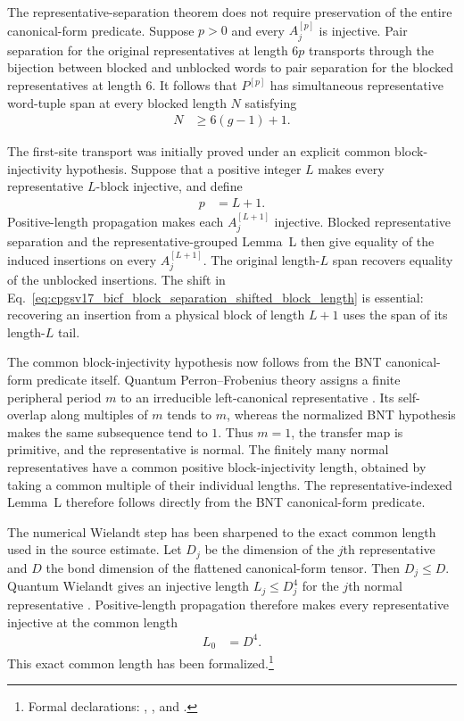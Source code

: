 \documentclass{article}
\begin{document}
The representative-separation theorem does not require preservation of the
entire canonical-form predicate. Suppose $p>0$ and every $A_j^{[p]}$ is
injective. Pair separation for the original representatives at length $6p$
transports through the bijection between blocked and unblocked words to pair
separation for the blocked representatives at length $6$. It follows that
$P^{[p]}$ has simultaneous representative word-tuple span at every blocked
length $N$ satisfying
\begin{align}
    N
        &\geq 6(g-1)+1.
    \label{eq:cpgsv17_bicf_block_separation_eventual_blocked_span_length}
\end{align}

The first-site transport was initially proved under an explicit common
block-injectivity hypothesis. Suppose that a positive integer $L$ makes every
representative $L$-block injective, and define
\begin{align}
    p
        &= L+1.
    \label{eq:cpgsv17_bicf_block_separation_shifted_block_length}
\end{align}
Positive-length propagation makes each $A_j^{[L+1]}$ injective. Blocked
representative separation and the representative-grouped Lemma~L then give
equality of the induced insertions on every $A_j^{[L+1]}$. The original
length-$L$ span recovers equality of the unblocked insertions. The shift in
Eq.~\ref{eq:cpgsv17_bicf_block_separation_shifted_block_length} is essential:
recovering an insertion from a physical block of length $L+1$ uses the span of
its length-$L$ tail.

The common block-injectivity hypothesis now follows from the BNT
canonical-form predicate itself. Quantum Perron--Frobenius theory assigns a
finite peripheral period $m$ to an irreducible left-canonical representative
\cite{Wolf2012Quantum}. Its self-overlap along multiples of $m$ tends to $m$,
whereas the normalized BNT hypothesis makes the same subsequence tend to $1$.
Thus $m=1$, the transfer map is primitive, and the representative is normal.
The finitely many normal representatives have a common positive
block-injectivity length, obtained by taking a common multiple of their
individual lengths. The representative-indexed Lemma~L therefore follows
directly from the BNT canonical-form predicate.

The numerical Wielandt step has been sharpened to the exact common length used
in the source estimate. Let $D_j$ be the dimension of the $j$th representative
and $D$ the bond dimension of the flattened canonical-form tensor. Then
$D_j\leq D$. Quantum Wielandt gives an injective length $L_j\leq D_j^4$ for
the $j$th normal representative \cite{Sanz2010Quantum}. Positive-length
propagation therefore makes every representative injective at the common
length
\begin{align}
    L_0
        &= D^4.
    \label{eq:cpgsv17_bicf_block_separation_common_wielandt_length}
\end{align}
This exact common length has been formalized.\footnote{Formal declarations:
    ,
    , and
    .}
\end{document}

